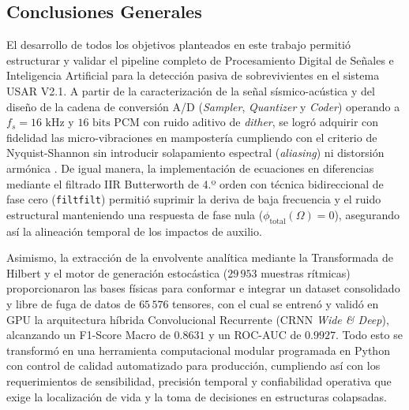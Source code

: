 \documentclass[11pt, a4paper]{article}
\begin{document}
\subsection{Conclusiones Generales}
El desarrollo de todos los objetivos planteados en este trabajo permitió estructurar y validar el pipeline completo de Procesamiento Digital de Señales e Inteligencia Artificial para la detección pasiva de sobrevivientes en el sistema USAR V2.1. A partir de la caracterización de la señal sísmico-acústica y del diseño de la cadena de conversión A/D (\textit{Sampler}, \textit{Quantizer} y \textit{Coder}) operando a $f_s = 16\text{ kHz}$ y $16\text{ bits}$ PCM con ruido aditivo de \textit{dither}, se logró adquirir con fidelidad las micro-vibraciones en mampostería cumpliendo con el criterio de Nyquist-Shannon sin introducir solapamiento espectral (\textit{aliasing}) ni distorsión armónica \cite{Oppenheim, Proakis}. De igual manera, la implementación de ecuaciones en diferencias mediante el filtrado IIR Butterworth de 4.º orden con técnica bidireccional de fase cero (\texttt{filtfilt}) permitió suprimir la deriva de baja frecuencia y el ruido estructural manteniendo una respuesta de fase nula ($\phi_{\text{total}}(\Omega) = 0$), asegurando así la alineación temporal de los impactos de auxilio.

Asimismo, la extracción de la envolvente analítica mediante la Transformada de Hilbert y el motor de generación estocástica ($29\,953$ muestras rítmicas) proporcionaron las bases físicas para conformar e integrar un dataset consolidado y libre de fuga de datos de $65\,576$ tensores, con el cual se entrenó y validó en GPU la arquitectura híbrida Convolucional Recurrente (CRNN \textit{Wide \& Deep}), alcanzando un F1-Score Macro de $0.8631$ y un ROC-AUC de $0.9927$. Todo esto se transformó en una herramienta computacional modular programada en Python con control de calidad automatizado para producción, cumpliendo así con los requerimientos de sensibilidad, precisión temporal y confiabilidad operativa que exige la localización de vida y la toma de decisiones en estructuras colapsadas.
\end{document}
